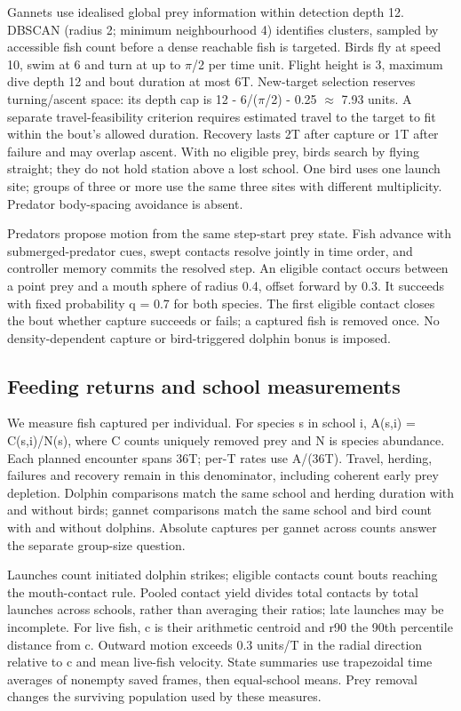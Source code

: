\documentclass[10pt,a4paper,twocolumn]{article}
\begin{document}
Gannets use idealised global prey information within detection depth 12. DBSCAN (radius 2; minimum neighbourhood 4) identifies clusters, sampled by accessible fish count before a dense reachable fish is targeted. Birds fly at speed 10, swim at 6 and turn at up to \ensuremath{\pi}/2 per time unit. Flight height is 3, maximum dive depth 12 and bout duration at most 6T. New-target selection reserves turning/ascent space: its depth cap is 12 - 6/(\ensuremath{\pi}/2) - 0.25 \ensuremath{\approx} 7.93 units. A separate travel-feasibility criterion requires estimated travel to the target to fit within the bout's allowed duration. Recovery lasts 2T after capture or 1T after failure and may overlap ascent. With no eligible prey, birds search by flying straight; they do not hold station above a lost school. One bird uses one launch site; groups of three or more use the same three sites with different multiplicity. Predator body-spacing avoidance is absent.

Predators propose motion from the same step-start prey state. Fish advance with submerged-predator cues, swept contacts resolve jointly in time order, and controller memory commits the resolved step. An eligible contact occurs between a point prey and a mouth sphere of radius 0.4, offset forward by 0.3. It succeeds with fixed probability q = 0.7 for both species. The first eligible contact closes the bout whether capture succeeds or fails; a captured fish is removed once. No density-dependent capture or bird-triggered dolphin bonus is imposed.

\subsection{Feeding returns and school measurements}
We measure fish captured per individual. For species s in school i, A(s,i) = C(s,i)/N(s), where C counts uniquely removed prey and N is species abundance. Each planned encounter spans 36T; per-T rates use A/(36T). Travel, herding, failures and recovery remain in this denominator, including coherent early prey depletion. Dolphin comparisons match the same school and herding duration with and without birds; gannet comparisons match the same school and bird count with and without dolphins. Absolute captures per gannet across counts answer the separate group-size question.

Launches count initiated dolphin strikes; eligible contacts count bouts reaching the mouth-contact rule. Pooled contact yield divides total contacts by total launches across schools, rather than averaging their ratios; late launches may be incomplete. For live fish, c is their arithmetic centroid and r90 the 90th percentile distance from c. Outward motion exceeds 0.3 units/T in the radial direction relative to c and mean live-fish velocity. State summaries use trapezoidal time averages of nonempty saved frames, then equal-school means. Prey removal changes the surviving population used by these measures.
\end{document}
